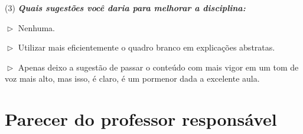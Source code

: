 \documentclass[
	12pt,				%
	openright,			%
	oneside,			%
	a4paper,			%
	chapter=TITLE,		%
	section=TITLE,		%
	english,			%
	french,				%
	spanish,			%
	brazil				%
	]{abntex2}
\begin{document}
(3) \textit{\textbf{Quais sugestões você daria para melhorar a disciplina:}}

$\vartriangleright$ Nenhuma.

$\vartriangleright$ Utilizar mais eficientemente o quadro branco em explicações abstratas.

$\vartriangleright$ Apenas deixo a sugestão de passar o conteúdo com mais vigor em um tom de voz mais alto, mas isso, é claro, é um pormenor dada a excelente aula.

\newpage
\chapter{Parecer do professor responsável}

\postextual
\newpage


%
%
\end{document}
